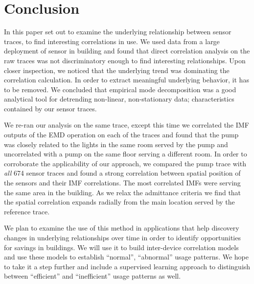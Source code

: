 



\section{Conclusion}





In this paper set out to examine the underlying relationship between sensor traces, to find interesting correlations
in use.  We used data from a large deployment of sensor in building and found that direct correlation analysis on the raw
traces was not discriminatory enough to find interesting relationships.  Upon closer inspection, we noticed that
the underlying trend was dominating the correlation calculation.  In order to extract meaningful underlying behavior, it has
to be removed.  We concluded that empirical mode decomposition was a good analytical tool for detrending 
non-linear, non-stationary data; characteristics contained by our sensor traces.

We re-ran our analysis on the same trace, except this time we correlated the IMF outputs of the EMD operation on each of the traces and found that the pump was closely related to the lights in the same room served by the pump and
uncorrelated with a pump on the same floor serving a different room.  In order to corroborate the applicability
of our approach, we compared the pump trace with \emph{all} 674 sensor traces and found a strong correlation
between spatial position of the sensors and their IMF correlations.  The most correlated IMFs were serving the same
area in the building.  As we relax the admittance criteria we find that the spatial correlation expands radially from
the main location served by the reference trace.

We plan to examine the use of this method in applications that help discovery changes in underlying relationships over time
in order to identify opportunities for savings in buildings.  We will use it to build inter-device correlation models
and use these models to establish ``normal'', ``abnormal'' usage patterns.  We hope to take it a step further and include a
supervised learning approach to distinguish between ``efficient'' and ``inefficient'' usage patterns as well.






